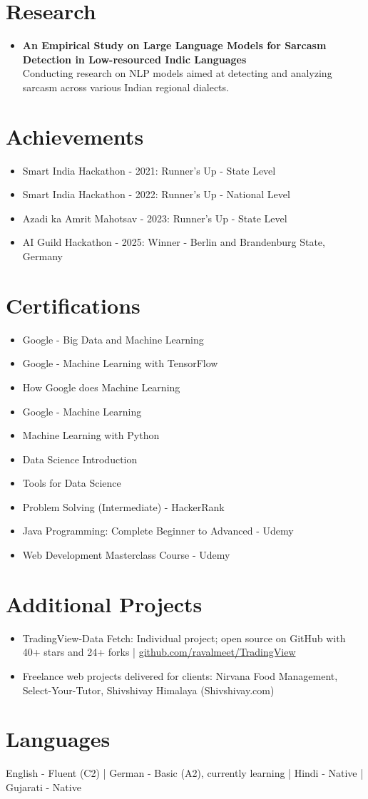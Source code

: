 \documentclass[a4paper,10pt]{article}
\begin{document}
\section*{Research}
\begin{itemize}
\item \textbf{An Empirical Study on Large Language Models for Sarcasm Detection in Low-resourced Indic Languages}\\ Conducting research on NLP models aimed at detecting and analyzing sarcasm across various Indian regional dialects.
\end{itemize}

\section*{Achievements}
\begin{itemize}
\item Smart India Hackathon - 2021: Runner's Up - State Level
\item Smart India Hackathon - 2022: Runner's Up - National Level
\item Azadi ka Amrit Mahotsav - 2023: Runner's Up - State Level
\item AI Guild Hackathon - 2025: Winner - Berlin and Brandenburg State, Germany
\end{itemize}

\section*{Certifications}
\begin{itemize}
\item Google - Big Data and Machine Learning
\item Google - Machine Learning with TensorFlow
\item How Google does Machine Learning
\item Google - Machine Learning
\item Machine Learning with Python
\item Data Science Introduction
\item Tools for Data Science
\item Problem Solving (Intermediate) - HackerRank
\item Java Programming: Complete Beginner to Advanced - Udemy
\item Web Development Masterclass Course - Udemy
\end{itemize}

\section*{Additional Projects}
\begin{itemize}
\item TradingView-Data Fetch: Individual project; open source on GitHub with 40+ stars and 24+ forks | \href{https://github.com/ravalmeet/TradingView}{github.com/ravalmeet/TradingView}
\item Freelance web projects delivered for clients: Nirvana Food Management, Select-Your-Tutor, Shivshivay Himalaya (Shivshivay.com)
\end{itemize}

\section*{Languages}
English - Fluent (C2) | German - Basic (A2), currently learning | Hindi - Native | Gujarati - Native\par
\end{document}
